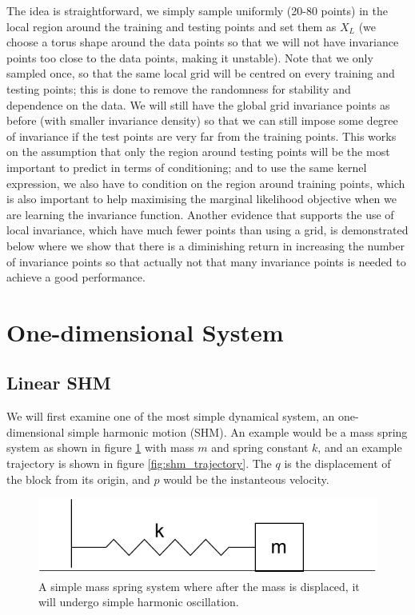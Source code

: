 \documentclass{statsmsc}
\begin{document}
The idea is straightforward, we simply sample uniformly (20-80 points) in the local region around the training and testing points and set them as $X_L$ (we choose a torus shape around the data points so that we will not have invariance points too close to the data points, making it unstable).
Note that we only sampled once, so that the same local grid will be centred on every training and testing points; this is done to remove the randomness for stability and dependence on the data.
We will still have the global grid invariance points as before (with smaller invariance density) so that we can still impose some degree of invariance if the test points are very far from the training points.
This works on the assumption that only the region around testing points will be the most important to predict in terms of conditioning; and to use the same kernel expression, we also have to condition on the region around training points, which is also important to help maximising the marginal likelihood objective when we are learning the invariance function.
Another evidence that supports the use of local invariance, which have much fewer points than using a grid, is demonstrated below where we show that there is a diminishing return in increasing the number of invariance points so that actually not that many invariance points is needed to achieve a good performance. 

\section{One-dimensional System}
\subsection{Linear SHM}
We will first examine one of the most simple dynamical system, an one-dimensional simple harmonic motion (SHM). 
An example would be a mass spring system as shown in figure \ref{fig:shm_diagram} with mass $m$ and spring constant $k$, and an example trajectory is shown in figure \ref{fig:shm_trajectory}. 
The $q$ is the displacement of the block from its origin, and $p$ would be the instanteous velocity.

\begin{figure}[H]
        \centering
        \includegraphics[width=0.8\linewidth]{../figures/shm.pdf}
        \caption{A simple mass spring system where after the mass is displaced, it will undergo simple harmonic oscillation.}
        \label{fig:shm_diagram}
\end{figure}
\end{document}
